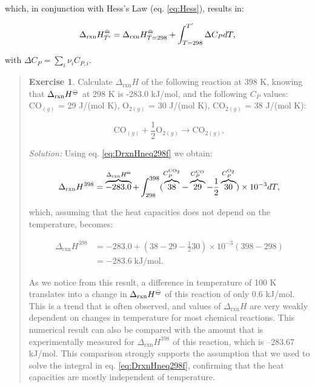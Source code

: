 \documentclass[
  9pt,
]{extbook}
\theoremstyle{definition}
\theoremstyle{definition}
\theoremstyle{definition}
\newtheorem{exercise}{Exercise}[chapter]
\theoremstyle{remark}
\begin{document}
which, in conjunction with Hess's Law (eq. \eqref{eq:Hess}), results in:

\begin{equation}
 \Delta_{\text{rxn}} H_{T'}^{-\kern-6pt{\ominus}\kern-6pt-}= \Delta_{\text{rxn}} H_{T=298}^{-\kern-6pt{\ominus}\kern-6pt-}+ \int_{T=298}^{T'} \Delta C_P dT,
  \label{eq:DrxnHneq298f}
\end{equation}

with \(\Delta C_P = \sum_i \nu_i C_{P,i}\).

\begin{quote}
\begin{exercise}
\protect\hypertarget{exr:DHtdiff298}{}{\label{exr:DHtdiff298} }Calculate \(\Delta_{\text{rxn}}H\) of the following reaction at 398 K, knowing that \(\Delta_{\text{rxn}}H^{-\kern-6pt{\ominus}\kern-6pt-}\) at 298 K is -283.0 kJ/mol, and the following \(C_P\) values: \(\mathrm{CO}_{(g)}\) = 29 J/(mol K), \(\mathrm{O}_{2(g)}\) = 30 J/(mol K), \(\mathrm{CO}_{2(g)}\) = 38 J/(mol K):

\[
\mathrm{CO}_{(g)}+\frac{1}{2}\mathrm{O}_{2(g)} \rightarrow \mathrm{CO}_{2(g)},
\]

\emph{Solution:} Using eq. \eqref{eq:DrxnHneq298f} we obtain:

\[
 \Delta_{\text{rxn}} H^{398} = \overbrace{-283.0}^{\Delta_{\text{rxn}}H^{-\kern-6pt{\ominus}\kern-6pt-}} + \int_{298}^{398} ( \overbrace{38}^{C_P^{\mathrm{CO}_2}} -\overbrace{29}^{C_P^{\mathrm{CO}}} -\frac{1}{2}\overbrace{30}^{C_P^{\mathrm{O}_2}} ) \times 10^{-3} dT,
\]

which, assuming that the heat capacities does not depend on the temperature, becomes:

\begin{equation}
\begin{aligned}
 \Delta_{\text{rxn}} H^{398} &= -283.0 + \left(38-29-\frac{1}{2}30 \right) \times 10^{-3} (398-298) \\ &= -283.6 \; \text{kJ/mol}.
\end{aligned}
\end{equation}

As we notice from this result, a difference in temperature of 100 K translates into a change in \(\Delta_{\text{rxn}}H^{-\kern-6pt{\ominus}\kern-6pt-}\) of this reaction of only 0.6 kJ/mol. This is a trend that is often observed, and values of \(\Delta_{\text{rxn}}H\) are very weakly dependent on changes in temperature for most chemical reactions. This numerical result can also be compared with the amount that is experimentally measured for \(\Delta_{\text{rxn}}H^{398}\) of this reaction, which is --283.67 kJ/mol. This comparison strongly supports the assumption that we used to solve the integral in eq. \eqref{eq:DrxnHneq298f}, confirming that the heat capacities are mostly independent of temperature.
\end{exercise}
\end{quote}
\end{document}
